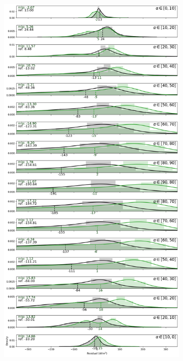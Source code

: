 \begin{figure}[htb!]
\begin{subfigure}{0.49\columnwidth}
    \end{subfigure}
    \begin{subfigure}{0.49\columnwidth}
        \includegraphics[width=\columnwidth, height=0.9\textheight]{figures/first_study/residual_errors_mlp_site3_rmse.png}
    \end{subfigure}
\end{figure}
